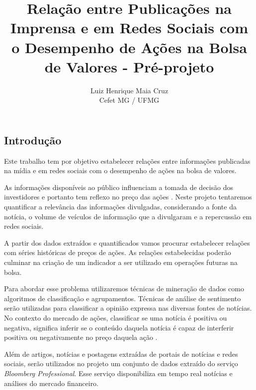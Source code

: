 \documentclass[twoside]{article}
\title{\vspace{-15mm}\fontsize{10pt}{10pt}\selectfont\textbf{Relação entre Publicações na Imprensa e em Redes Sociais com o Desempenho de Ações na Bolsa de Valores - Pré-projeto}} %
\author{
\normalsize Luiz Henrique Maia Cruz \\ %
\normalsize Cefet MG / UFMG \\ %
\vspace{-5mm}
}
\date{}
\begin{document}
\maketitle %

\thispagestyle{fancy} %


\begin{multicols}{2} %

\section{Introdução}

\lettrine[nindent=0em,lines=3]{E} ste trabalho tem por objetivo estabelecer relações entre informações publicadas na mídia e em redes sociais com o desempenho de ações na bolsa de valores.

As informações disponíveis ao público influenciam a tomada de decisão dos investidores e portanto tem reflexo no preço das ações \cite{ChanChui:2001}. Neste projeto tentaremos quantificar a relevância das  informações divulgadas, considerando a fonte da notícia, o volume de veículos de informação que a divulgaram e a repercussão em redes sociais.

A partir dos dados extraídos e quantificados vamos procurar estabelecer relações com séries históricas de preços de ações. As relações estabelecidas poderão culminar na criação de um indicador a ser utilizado em operações futuras na bolsa.

Para abordar esse problema utilizaremos técnicas de mineração de dados como algoritmos de classificação e agrupamentos. Técnicas de análise de sentimento serão utilizadas para classificar a opinião expressa nas diversas fontes de notícias. No contexto do mercado de ações, classificar se uma notícia é positiva ou negativa, significa inferir se o conteúdo daquela notícia é capaz de interferir positiva ou negativamente no preço daquela ação \cite{ChanChui:2001}.

Além de artigos, notícias e postagens extraídas de portais de notícias e redes sociais, serão utilizados no projeto um conjunto de dados extraído do serviço \emph{Bloomberg Professional}. Esse serviço disponibiliza em tempo real notícias e análises do mercado financeiro.


\end{multicols}
\end{document}
